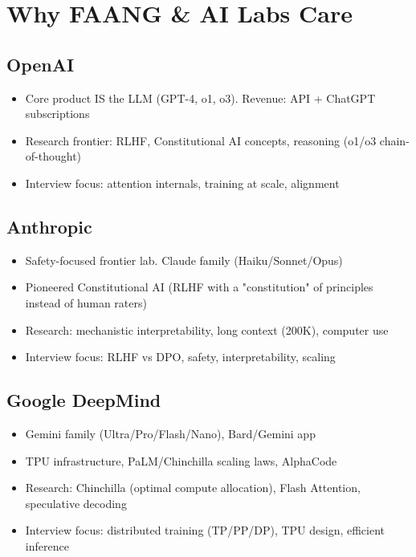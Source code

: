 \documentclass[11pt]{article}
\providecommand{\tightlist}{\setlength{\itemsep}{1pt}\setlength{\parskip}{0pt}}
\begin{document}
\section{Why FAANG \& AI Labs Care}\label{why-faang--ai-labs-care}

\subsection{OpenAI}\label{openai}

\begin{itemize}
\tightlist
\item
  Core product IS the LLM (GPT-4, o1, o3). Revenue: API + ChatGPT subscriptions
\item
  Research frontier: RLHF, Constitutional AI concepts, reasoning (o1/o3 chain-of-thought)
\item
  Interview focus: attention internals, training at scale, alignment
\end{itemize}

\subsection{Anthropic}\label{anthropic}

\begin{itemize}
\tightlist
\item
  Safety-focused frontier lab. Claude family (Haiku/Sonnet/Opus)
\item
  Pioneered Constitutional AI (RLHF with a "constitution" of principles instead of human raters)
\item
  Research: mechanistic interpretability, long context (200K), computer use
\item
  Interview focus: RLHF vs DPO, safety, interpretability, scaling
\end{itemize}

\subsection{Google DeepMind}\label{google-deepmind}

\begin{itemize}
\tightlist
\item
  Gemini family (Ultra/Pro/Flash/Nano), Bard/Gemini app
\item
  TPU infrastructure, PaLM/Chinchilla scaling laws, AlphaCode
\item
  Research: Chinchilla (optimal compute allocation), Flash Attention, speculative decoding
\item
  Interview focus: distributed training (TP/PP/DP), TPU design, efficient inference
\end{itemize}
\end{document}
